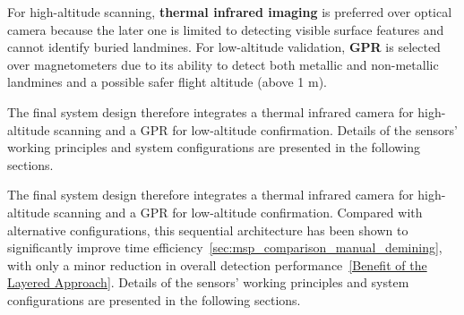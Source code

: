 For high-altitude scanning, \textbf{thermal infrared imaging} is preferred over optical camera because the later one is limited to detecting visible surface features and cannot identify buried landmines. For low-altitude validation, \textbf{\gls{GPR}} is selected over magnetometers due to its ability to detect both metallic and non-metallic landmines and a possible safer flight altitude (above 1 m).

The final system design therefore integrates a thermal infrared camera for high-altitude scanning and a \gls{GPR} for low-altitude confirmation. Details of the sensors' working principles and system configurations are presented in the following sections. 

The final system design therefore integrates a thermal infrared camera for high-altitude scanning and a \gls{GPR} for low-altitude confirmation. Compared with alternative configurations, this sequential architecture has been shown to significantly improve time efficiency~\ref{sec:msp_comparison_manual_demining}, with only a minor reduction in overall detection performance~\ref{Benefit of the Layered Approach}. Details of the sensors’ working principles and system configurations are presented in the following sections.